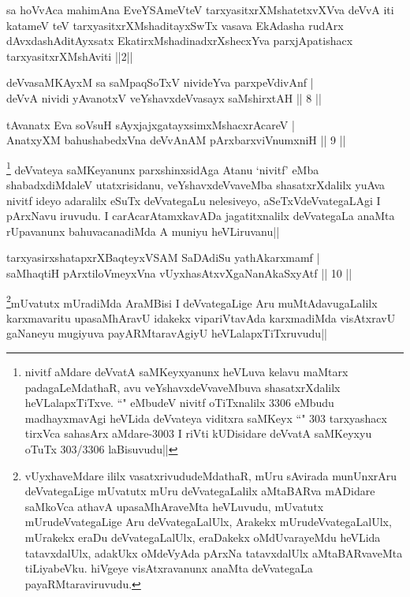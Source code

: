 \begin{shl}
sa hoVvAca mahimAna EveYSAmeVteV tarxyasitxrXMshatetxvXVva deVvA iti katameV teV tarxyasitxrXMshaditayxSwTx vasava EkAdasha rudArx dAvxdashAditAyxsatx EkatirxMshadinadxrXshecxYva parxjApatishacx tarxyasitxrXMshAviti ||2||
\end{shl}

\begin{shl}
deVvasaMKAyxM sa saMpaqSoTxV nivideYva parxpeVdivAnf |\\
deVvA nividi yAvanotxV veYshavxdeVvasayx saMshirxtAH \hfill || 8 ||
\end{shl}

\begin{shl}
tAvanatx Eva soV\s suH sAyxjajxgatayxsimxMshacxrAcareV |\\
AnatxyXM bahushabedxVna deVvAnAM pArxbarxviVnumxniH \hfill || 9 ||
\end{shl}

\begin{artha}
\footnote[3]{nivitf aMdare deVvatA saMKeyxyanunx heVLuva kelavu maMtarx padagaLeMdathaR, avu veYshavxdeVvaveMbuva shasatxrXdalilx heVLalapxTiTxve. ``\stext " eMbudeV nivitf oTiTxnalilx 3306 eMbudu madhayxmavAgi heVLida deVvateya viditxra saMKeyx ``\stext " 303  tarxyashacx tirxVca sahasArx aMdare-3003 I riVti kUDisidare deVvatA saMKeyxyu oTuTx 303/3306 laBisuvudu||} deVvateya saMKeyanunx parxshinxsidAga Atanu `nivitf' eMba shabadxdiMdaleV utatxrisidanu, veYshavxdeVvaveMba shasatxrXdalilx yuAva nivitf ideyo adaralilx eSuTx deVvategaLu nelesiveyo, aSeTxVdeVvategaLAgi I pArxNavu iruvudu. I carAcarAtamxkavADa jagatitxnalilx deVvategaLa anaMta rUpavanunx bahuvacanadiMda A muniyu heVLiruvanu||
\end{artha}%


\begin{shl}
tarxyasirxshatapxrXBaqteyxVSAM SaDAdiSu yathAkarxmamf |\\
saMhaqtiH pArxtiloVmeyxVna vUyxhasAtxvXgaNanAkaSxyAtf \hfill || 10 ||
\end{shl}

\begin{artha}
\footnote[1]{vUyxhaveMdare ililx vasatxrivududeMdathaR, mUru sAvirada munUnxrAru deVvategaLige mUvatutx mUru deVvategaLalilx aMtaBARva mADidare saMkoVca athavA upasaMhAraveMta heVLuvudu, mUvatutx mUrudeVvategaLige Aru deVvategaLalUlx, Arakekx mUrudeVvategaLalUlx, mUrakekx eraDu deVvategaLalUlx, eraDakekx oMdUvarayeMdu heVLida tatavxdalUlx, adakUkx oMdeVyAda pArxNa tatavxdalUlx aMtaBARvaveMta tiLiyabeVku. hiVgeye visAtxravanunx anaMta deVvategaLa payaRMtaraviruvudu.}mUvatutx mUradiMda AraMBisi I deVvategaLige Aru muMtAdavugaLalilx karxmavaritu upasaMhAravU idakekx vipariVtavAda karxmadiMda  visAtxravU gaNaneyu mugiyuva payARMtaravAgiyU heVLalapxTiTxruvudu||
\end{artha}

